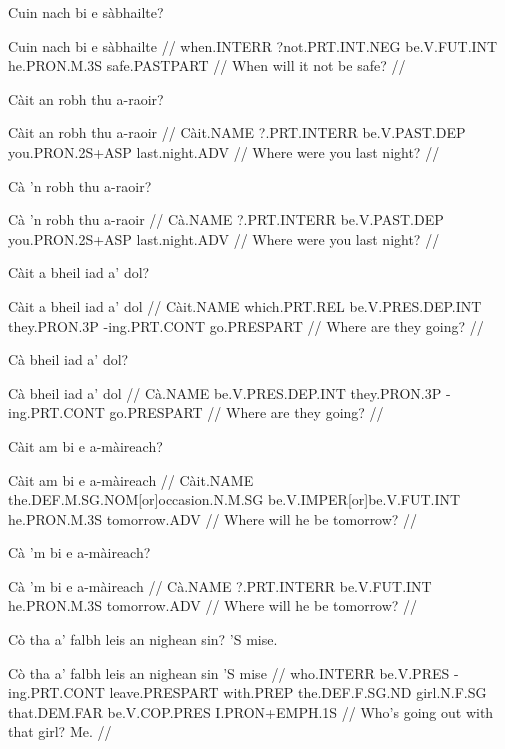 \documentclass[a4paper,10pt]{article}
\begin{document}
\ex
\begingl
\glpre Cuin nach bi e sàbhailte? 

\vspace{4mm}
\gla Cuin nach bi e sàbhailte  //
\glb when.INTERR ?not.PRT.INT.NEG be.V.FUT.INT he.PRON.M.3S safe.PASTPART  //
\glft When will it not be safe? //
\endgl
\xe

\ex
\begingl
\glpre Càit an robh thu a-raoir? 

\vspace{4mm}
\gla Càit an robh thu a-raoir  //
\glb Càit.NAME ?.PRT.INTERR be.V.PAST.DEP you.PRON.2S+ASP last.night.ADV  //
\glft Where were you last night? //
\endgl
\xe

\ex
\begingl
\glpre Cà 'n robh thu a-raoir? 

\vspace{4mm}
\gla Cà 'n robh thu a-raoir  //
\glb Cà.NAME ?.PRT.INTERR be.V.PAST.DEP you.PRON.2S+ASP last.night.ADV  //
\glft Where were you last night? //
\endgl
\xe

\ex
\begingl
\glpre Càit a bheil iad a' dol? 

\vspace{4mm}
\gla Càit a bheil iad a' dol  //
\glb Càit.NAME which.PRT.REL be.V.PRES.DEP.INT they.PRON.3P -ing.PRT.CONT go.PRESPART  //
\glft Where are they going? //
\endgl
\xe

\ex
\begingl
\glpre Cà bheil iad a' dol? 

\vspace{4mm}
\gla Cà bheil iad a' dol  //
\glb Cà.NAME be.V.PRES.DEP.INT they.PRON.3P -ing.PRT.CONT go.PRESPART  //
\glft Where are they going? //
\endgl
\xe

\ex
\begingl
\glpre Càit am bi e a-màireach? 

\vspace{4mm}
\gla Càit am bi e a-màireach  //
\glb Càit.NAME the.DEF.M.SG.NOM[or]occasion.N.M.SG be.V.IMPER[or]be.V.FUT.INT he.PRON.M.3S tomorrow.ADV  //
\glft Where will he be tomorrow? //
\endgl
\xe

\ex
\begingl
\glpre Cà 'm bi e a-màireach? 

\vspace{4mm}
\gla Cà 'm bi e a-màireach  //
\glb Cà.NAME ?.PRT.INTERR be.V.FUT.INT he.PRON.M.3S tomorrow.ADV  //
\glft Where will he be tomorrow? //
\endgl
\xe

\ex
\begingl
\glpre Cò tha a' falbh leis an nighean sin? 'S mise. 

\vspace{4mm}
\gla Cò tha a' falbh leis an nighean sin 'S mise  //
\glb who.INTERR be.V.PRES -ing.PRT.CONT leave.PRESPART with.PREP the.DEF.F.SG.ND girl.N.F.SG that.DEM.FAR be.V.COP.PRES I.PRON+EMPH.1S  //
\glft Who's going out with that girl? Me. //
\endgl
\xe
\end{document}
